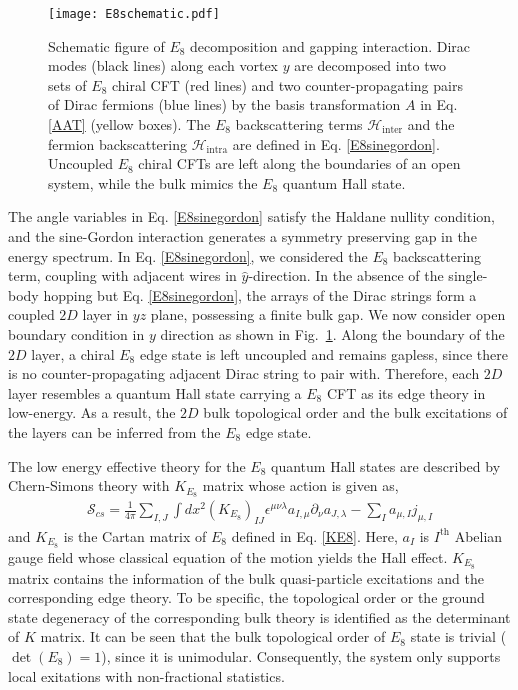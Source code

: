 \begin{figure}[htbp]
	\centering\texttt{[image: E8schematic.pdf]}
	\caption[Schematic figure of $E_8$ decomposition and gapping interaction.]{Schematic figure of $E_8$ decomposition and gapping interaction. Dirac modes (black lines) along each vortex $y$ are decomposed into two sets of $E_8$ chiral CFT (red lines) and two counter-propagating pairs of Dirac fermions (blue lines) by the basis transformation $A$ in Eq. \eqref{AAT} (yellow boxes). The $E_8$ backscattering terms $\mathcal{H}_{\mathrm{inter}}$ and the fermion backscattering $\mathcal{H}_{\mathrm{intra}}$ are defined in Eq. \eqref{E8sinegordon}. Uncoupled $E_8$ chiral CFTs are left along the boundaries of an open system, while the bulk mimics the $E_8$ quantum Hall state.}\label{fig:E8schematic}
\end{figure}

The angle variables in Eq. \eqref{E8sinegordon} satisfy the Haldane nullity condition, and the sine-Gordon interaction generates a symmetry preserving gap in the energy spectrum. In Eq. \eqref{E8sinegordon}, we considered the $E_8$ backscattering term, coupling with adjacent wires in $\hat{y}$-direction. In the absence of the single-body hopping but Eq. \eqref{E8sinegordon}, the arrays of the Dirac strings form a coupled $2D$ layer in $yz$ plane, possessing a finite bulk gap. We now consider open boundary condition in $y$ direction as shown in Fig.~\ref{fig:E8schematic}. Along the boundary of the $2D$ layer, a chiral $E_8$ edge state is left uncoupled and remains gapless, since there is no counter-propagating adjacent Dirac string to pair with. Therefore, each $2D$ layer resembles a quantum Hall state carrying a $E_8$ CFT as its edge theory in low-energy. As a result, the $2D$ bulk topological order and the bulk excitations of the layers can be inferred from the $E_8$ edge state.

The low energy effective theory for the $E_8$ quantum Hall states are described by Chern-Simons theory with $K_{E_8}$ matrix whose action is given as,
\begin{gather}
\mathcal{S}_{cs}=\frac{1}{4\pi}\sum_{I,J}\int dx^2  (K_{E_8})_{IJ} \epsilon^{\mu\nu\lambda} a_{I,\mu}\partial_{\nu}a_{J,\lambda}-\sum_{I}a_{\mu,I}j_{\mu, I}
\end{gather}
and $K_{E_8}$ is the Cartan matrix of $E_8$ defined in Eq. \eqref{KE8}. Here, $a_I$ is $I^{\mathrm{th}}$ Abelian gauge field whose classical equation of the motion yields the Hall effect. $K_{E_8}$ matrix contains the information of the bulk quasi-particle excitations and the corresponding edge theory. To be specific, the topological order or the ground state degeneracy of the corresponding bulk theory is identified as the determinant of $K$ matrix. It can be seen that the bulk topological order of $E_8$ state is trivial ($\det(E_8)=1$), since it is unimodular. Consequently, the system only supports local exitations with non-fractional statistics.

